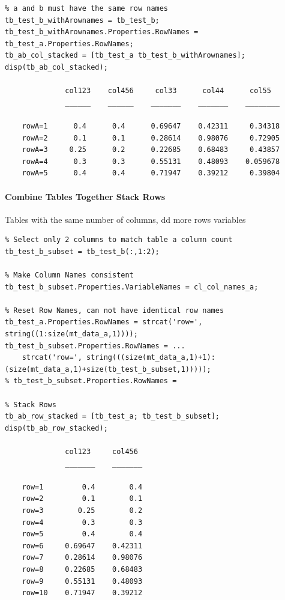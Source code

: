 \documentclass[
]{book}
\begin{document}
\begin{verbatim}
% a and b must have the same row names
tb_test_b_withArownames = tb_test_b;
tb_test_b_withArownames.Properties.RowNames = tb_test_a.Properties.RowNames;
tb_ab_col_stacked = [tb_test_a tb_test_b_withArownames];
disp(tb_ab_col_stacked);

              col123    col456     col33      col44      col55  
              ______    ______    _______    _______    ________

    rowA=1      0.4      0.4      0.69647    0.42311     0.34318
    rowA=2      0.1      0.1      0.28614    0.98076     0.72905
    rowA=3     0.25      0.2      0.22685    0.68483     0.43857
    rowA=4      0.3      0.3      0.55131    0.48093    0.059678
    rowA=5      0.4      0.4      0.71947    0.39212     0.39804
\end{verbatim}

\hypertarget{combine-tables-together-stack-rows}{%
\paragraph{Combine Tables Together Stack Rows}\label{combine-tables-together-stack-rows}}

Tables with the same number of columns, dd more rows variables

\begin{verbatim}
% Select only 2 columns to match table a column count
tb_test_b_subset = tb_test_b(:,1:2);

% Make Column Names consistent
tb_test_b_subset.Properties.VariableNames = cl_col_names_a;

% Reset Row Names, can not have identical row names
tb_test_a.Properties.RowNames = strcat('row=', string((1:size(mt_data_a,1))));
tb_test_b_subset.Properties.RowNames = ...
    strcat('row=', string(((size(mt_data_a,1)+1):(size(mt_data_a,1)+size(tb_test_b_subset,1)))));
% tb_test_b_subset.Properties.RowNames =

% Stack Rows
tb_ab_row_stacked = [tb_test_a; tb_test_b_subset];
disp(tb_ab_row_stacked);

              col123     col456 
              _______    _______

    row=1         0.4        0.4
    row=2         0.1        0.1
    row=3        0.25        0.2
    row=4         0.3        0.3
    row=5         0.4        0.4
    row=6     0.69647    0.42311
    row=7     0.28614    0.98076
    row=8     0.22685    0.68483
    row=9     0.55131    0.48093
    row=10    0.71947    0.39212
\end{verbatim}
\end{document}
